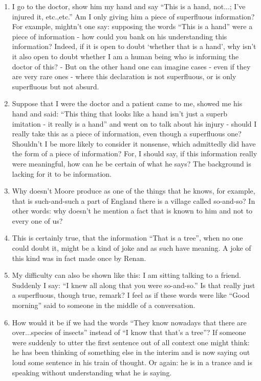 \documentclass{book}
\begin{document}
\begin{enumerate}
\item
I go to the doctor, show him my hand and say ``This is a hand, not...; I've
injured it, etc.,etc.'' Am I only giving him a piece of superfluous
information? For example, mightn't one say: supposing the words ``This is a
hand'' were a piece of information - how could you bank on his understanding
this information? Indeed, if it is open to doubt `whether that is a hand', why
isn't it also open to doubt whether I am a human being who is informing the
doctor of this? - But on the other hand one can imagine cases - even if they
are very rare ones - where this declaration is not superfluous, or is only
superfluous but not absurd.

\item
Suppose that I were the doctor and a patient came to me, showed me his hand and
said: ``This thing that looks like a hand isn't just a superb imitation - it
really is a hand'' and went on to talk about his injury - should I really take
this as a piece of information, even though a superfluous one? Shouldn't I be
more likely to consider it nonsense, which admittedly did have the form of a
piece of information? For, I should say, if this information really were
meaningful, how can he be certain of what he says? The background is lacking
for it to be information.

\item
Why doesn't Moore produce as one of the things that he knows, for example, that
is such-and-such a part of England there is a village called so-and-so? In
other words: why doesn't he mention a fact that is known to him and not to
every one of us?

\item
This is certainly true, that the information ``That is a tree'', when no one
could doubt it, might be a kind of joke and as such have meaning. A joke of
this kind was in fact made once by Renan.

\item
My difficulty can also be shown like this: I am sitting talking to a friend.
Suddenly I say: ``I knew all along that you were so-and-so.'' Is that really
just a superfluous, though true, remark?  I feel as if these words were like
``Good morning'' said to someone in the middle of a conversation.

\item
How would it be if we had the words ``They know nowadays that there are
over...species of insects'' instead of ``I know that that's a tree''? If
someone were suddenly to utter the first sentence out of all context one might
think: he has been thinking of something else in the interim and is now saying
out loud some sentence in his train of thought. Or again: he is in a trance and
is speaking without understanding what he is saying.


\end{enumerate}
\end{document}
